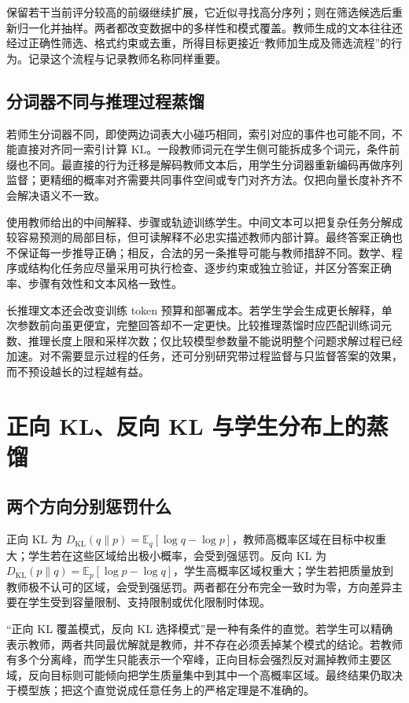 \documentclass[UTF8,12pt,a4paper,fontset=fandol]{ctexart}
\begin{document}
保留若干当前评分较高的前缀继续扩展，它近似寻找高分序列；则在筛选候选后重新归一化并抽样。两者都改变数据中的多样性和模式覆盖。教师生成的文本往往还经过正确性筛选、格式约束或去重，所得目标更接近“教师加生成及筛选流程”的行为。记录这个流程与记录教师名称同样重要。

\subsection{分词器不同与推理过程蒸馏}
若师生分词器不同，即使两边词表大小碰巧相同，索引对应的事件也可能不同，不能直接对齐同一索引计算 KL。一段教师词元在学生侧可能拆成多个词元，条件前缀也不同。最直接的行为迁移是解码教师文本后，用学生分词器重新编码再做序列监督；更精细的概率对齐需要共同事件空间或专门对齐方法。仅把向量长度补齐不会解决语义不一致。

使用教师给出的中间解释、步骤或轨迹训练学生。中间文本可以把复杂任务分解成较容易预测的局部目标，但可读解释不必忠实描述教师内部计算。最终答案正确也不保证每一步推导正确；相反，合法的另一条推导可能与教师措辞不同。数学、程序或结构化任务应尽量采用可执行检查、逐步约束或独立验证，并区分答案正确率、步骤有效性和文本风格一致性。

长推理文本还会改变训练 token 预算和部署成本。若学生学会生成更长解释，单次参数前向虽更便宜，完整回答却不一定更快。比较推理蒸馏时应匹配训练词元数、推理长度上限和采样次数；仅比较模型参数量不能说明整个问题求解过程已经加速。对不需要显示过程的任务，还可分别研究带过程监督与只监督答案的效果，而不预设越长的过程越有益。

\section{正向 KL、反向 KL 与学生分布上的蒸馏}
\label{sec:kd-onpolicy}

\subsection{两个方向分别惩罚什么}
正向 KL 为 $D_{\mathrm{KL}}(q\|p)=\mathbb E_q[\log q-\log p]$，教师高概率区域在目标中权重大；学生若在这些区域给出极小概率，会受到强惩罚。反向 KL 为 $D_{\mathrm{KL}}(p\|q)=\mathbb E_p[\log p-\log q]$，学生高概率区域权重大；学生若把质量放到教师极不认可的区域，会受到强惩罚。两者都在分布完全一致时为零，方向差异主要在学生受到容量限制、支持限制或优化限制时体现。

“正向 KL 覆盖模式，反向 KL 选择模式”是一种有条件的直觉。若学生可以精确表示教师，两者共同最优解就是教师，并不存在必须丢掉某个模式的结论。若教师有多个分离峰，而学生只能表示一个窄峰，正向目标会强烈反对漏掉教师主要区域，反向目标则可能倾向把学生质量集中到其中一个高概率区域。最终结果仍取决于模型族；把这个直觉说成任意任务上的严格定理是不准确的。
\end{document}
